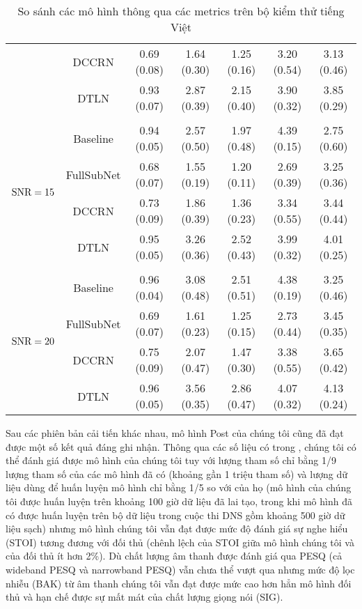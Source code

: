 \begin{table}[h]
\begin{tabular}{l c c c c c c}
				&DCCRN  & 0.69 (0.08)   & 1.64 (0.30)   & 1.25 (0.16)   & 3.20 (0.54)   & 3.13 (0.46) \\
				&DTLN   & 0.93 (0.07)   & 2.87 (0.39)   & 2.15 (0.40)   & 3.90 (0.32)   & 3.85 (0.29) \\
				&&&&&&\\
				\multirow{4}{*}{$\text{SNR}=15$}        &Baseline       & 0.94 (0.05)   & 2.57 (0.50)   & 1.97 (0.48)   & 4.39 (0.15)   & 2.75 (0.60) \\
				&FullSubNet     & 0.68 (0.07)   & 1.55 (0.19)   & 1.20 (0.11)   & 2.69 (0.39)   & 3.25 (0.36) \\
				&DCCRN  & 0.73 (0.09)   & 1.86 (0.39)   & 1.36 (0.23)   & 3.34 (0.55)   & 3.44 (0.44) \\
				&DTLN   & 0.95 (0.05)   & 3.26 (0.36)   & 2.52 (0.43)   & 3.99 (0.32)   & 4.01 (0.25) \\
				&&&&&&\\
				\multirow{4}{*}{$\text{SNR}=20$}        &Baseline       & 0.96 (0.04)   & 3.08 (0.48)   & 2.51 (0.51)   & 4.38 (0.19)   & 3.25 (0.46) \\
				&FullSubNet     & 0.69 (0.07)   & 1.61 (0.23)   & 1.25 (0.15)   & 2.73 (0.44)   & 3.45 (0.35) \\
				&DCCRN  & 0.75 (0.09)   & 2.07 (0.47)   & 1.47 (0.30)   & 3.38 (0.55)   & 3.65 (0.42) \\
				&DTLN   & 0.96 (0.05)   & 3.56 (0.35)   & 2.86 (0.47)   & 4.07 (0.32)   & 4.13 (0.24) \\
				\hline
			\end{tabular}
			\caption{So sánh các mô hình thông qua các metrics trên bộ kiểm thử tiếng Việt}
			\label{re::competitors_metrics}
		\end{table}
	
	Sau các phiên bản cải tiến khác nhau, mô hình Post của chúng tôi cũng đã đạt được một số kết quả đáng ghi nhận. Thông qua các số liệu có trong , chúng tôi có thể đánh giá được mô hình của chúng tôi tuy với lượng tham số chỉ bằng 1/9 lượng tham số của các mô hình đã có (khoảng gần 1 triệu tham số) và lượng dữ liệu dùng để huấn luyện mô hình chỉ bằng 1/5 so với của họ (mô hình của chúng tôi được huấn luyện trên khoảng 100 giờ dữ liệu đã lai tạo, trong khi mô hình đã có được huấn luyện trên bộ dữ liệu trong cuộc thi DNS gồm khoảng 500 giờ dữ liệu sạch) nhưng mô hình chúng tôi vẫn đạt được mức độ đánh giá sự nghe hiểu (STOI) tương đương với đối thủ (chênh lệch của STOI giữa mô hình chúng tôi và của đối thủ ít hơn 2\%). Dù chất lượng âm thanh được đánh giá qua PESQ (cả wideband PESQ và narrowband PESQ) vẫn chưa thể vượt qua nhưng mức độ lọc nhiễu (BAK) từ âm thanh chúng tôi vẫn đạt được mức cao hơn hẳn mô hình đối thủ và hạn chế được sự mất mát của chất lượng giọng nói (SIG).
	
